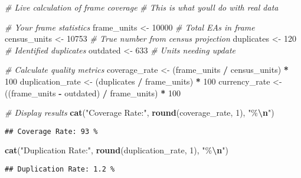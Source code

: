 \documentclass[
]{article}
\newenvironment{Shaded}{\begin{snugshade}}{\end{snugshade}}
\newcommand{\CommentTok}[1]{\textcolor[rgb]{0.56,0.35,0.01}{\textit{#1}}}
\newcommand{\DecValTok}[1]{\textcolor[rgb]{0.00,0.00,0.81}{#1}}
\newcommand{\FunctionTok}[1]{\textcolor[rgb]{0.13,0.29,0.53}{\textbf{#1}}}
\newcommand{\NormalTok}[1]{#1}
\newcommand{\OtherTok}[1]{\textcolor[rgb]{0.56,0.35,0.01}{#1}}
\newcommand{\SpecialCharTok}[1]{\textcolor[rgb]{0.81,0.36,0.00}{\textbf{#1}}}
\newcommand{\StringTok}[1]{\textcolor[rgb]{0.31,0.60,0.02}{#1}}
\begin{document}
\begin{Shaded}
\begin{Highlighting}[]
\CommentTok{\# Live calculation of frame coverage}
\CommentTok{\# This is what you\textquotesingle{}ll do with real data}

\CommentTok{\# Your frame statistics}
\NormalTok{frame\_units }\OtherTok{\textless{}{-}} \DecValTok{10000}  \CommentTok{\# Total EAs in frame}
\NormalTok{census\_units }\OtherTok{\textless{}{-}} \DecValTok{10753}  \CommentTok{\# True number from census projection}
\NormalTok{duplicates }\OtherTok{\textless{}{-}} \DecValTok{120}     \CommentTok{\# Identified duplicates}
\NormalTok{outdated }\OtherTok{\textless{}{-}} \DecValTok{633}       \CommentTok{\# Units needing update}

\CommentTok{\# Calculate quality metrics}
\NormalTok{coverage\_rate }\OtherTok{\textless{}{-}}\NormalTok{ (frame\_units }\SpecialCharTok{/}\NormalTok{ census\_units) }\SpecialCharTok{*} \DecValTok{100}
\NormalTok{duplication\_rate }\OtherTok{\textless{}{-}}\NormalTok{ (duplicates }\SpecialCharTok{/}\NormalTok{ frame\_units) }\SpecialCharTok{*} \DecValTok{100}
\NormalTok{currency\_rate }\OtherTok{\textless{}{-}}\NormalTok{ ((frame\_units }\SpecialCharTok{{-}}\NormalTok{ outdated) }\SpecialCharTok{/}\NormalTok{ frame\_units) }\SpecialCharTok{*} \DecValTok{100}

\CommentTok{\# Display results}
\FunctionTok{cat}\NormalTok{(}\StringTok{"Coverage Rate:"}\NormalTok{, }\FunctionTok{round}\NormalTok{(coverage\_rate, }\DecValTok{1}\NormalTok{), }\StringTok{"\%}\SpecialCharTok{\textbackslash{}n}\StringTok{"}\NormalTok{)}
\end{Highlighting}
\end{Shaded}

\begin{verbatim}
## Coverage Rate: 93 %
\end{verbatim}

\begin{Shaded}
\begin{Highlighting}[]
\FunctionTok{cat}\NormalTok{(}\StringTok{"Duplication Rate:"}\NormalTok{, }\FunctionTok{round}\NormalTok{(duplication\_rate, }\DecValTok{1}\NormalTok{), }\StringTok{"\%}\SpecialCharTok{\textbackslash{}n}\StringTok{"}\NormalTok{)}
\end{Highlighting}
\end{Shaded}

\begin{verbatim}
## Duplication Rate: 1.2 %
\end{verbatim}
\end{document}
